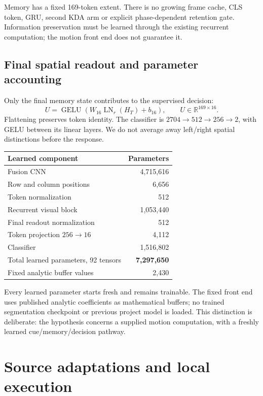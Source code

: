 \documentclass[11pt]{article}
\newcommand{\LN}{\operatorname{LN}}
\newcommand{\GELU}{\operatorname{GELU}}
\begin{document}
Memory has a fixed 169-token extent. There is no growing frame cache, CLS token, GRU, second KDA arm or explicit phase-dependent retention gate. Information preservation must be learned through the existing recurrent computation; the motion front end does not guarantee it.

\subsection{Final spatial readout and parameter accounting}

Only the final memory state contributes to the supervised decision:
\[
 U=\GELU(W_{16}\LN_r(H_T)+b_{16}),\qquad
 U\in\mathbb R^{169\times16}.
\]
Flattening preserves token identity. The classifier is $2704\rightarrow512\rightarrow256\rightarrow2$, with GELU between its linear layers. We do not average away left/right spatial distinctions before the response.

\begin{center}
\begin{tabular}{lr}
\toprule
Learned component & Parameters \\
\midrule
Fusion CNN & 4,715,616 \\
Row and column positions & 6,656 \\
Token normalization & 512 \\
Recurrent visual block & 1,053,440 \\
Final readout normalization & 512 \\
Token projection $256\rightarrow16$ & 4,112 \\
Classifier & 1,516,802 \\
\midrule
Total learned parameters, 92 tensors & \textbf{7,297,650} \\
Fixed analytic buffer values & 2,430 \\
\bottomrule
\end{tabular}
\end{center}

Every learned parameter starts fresh and remains trainable. The fixed front end uses published analytic coefficients as mathematical buffers; no trained segmentation checkpoint or previous project model is loaded. This distinction is deliberate: the hypothesis concerns a supplied motion computation, with a freshly learned cue/memory/decision pathway.

\section{Source adaptations and local execution}
\end{document}
